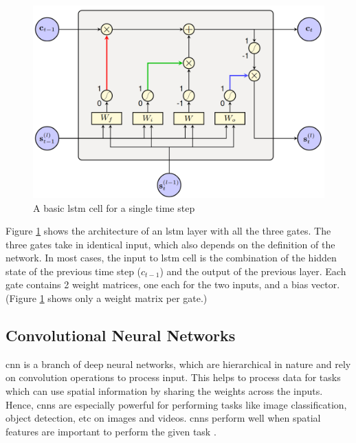 \begin{figure}[ht]
  \begin{center}
    \includegraphics[width=\textwidth]{images/lstm.png} 
    \caption{A basic \acrshort{lstm} cell for a single time step \cite{Enarvi2018ModelingRecognition}}
    \label{fig:lstm}
  \end{center}
\end{figure}

Figure \ref{fig:lstm} shows the architecture of an \acrshort{lstm} layer with all the three gates. The three gates take in identical input, which also depends on the definition of the network. In most cases, the input to \acrshort{lstm} cell is the combination of the hidden state of the previous time step ($c_{t-1}$) and the output of the previous layer. Each gate contains 2 weight matrices, one each for the two inputs, and a bias vector. (Figure \ref{fig:lstm} shows only a weight matrix per gate.) 


\subsection {Convolutional Neural Networks}
\acrfull{cnn} is a branch of deep neural networks, which are hierarchical in nature and rely on convolution operations to process input. This helps to process data for tasks which can use spatial information by sharing the weights across the inputs. Hence, \acrshort{cnn}s  are especially powerful for performing tasks like image classification, object detection, etc on images and videos. \acrshort{cnn}s perform well when spatial features are important to perform the given task \cite{Krizhevsky2012ImageNetNetworks}.

